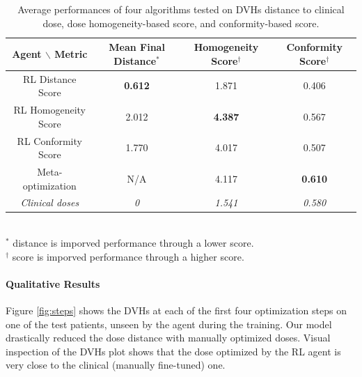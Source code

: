 \begin{table}
	\begin{center}
		\begin{tabular}{| c || c | c | c |} 
			\hline
			Agent $\backslash$ Metric & Mean Final Distance$^*$ & Homogeneity Score$^\dagger$ & Conformity Score$^\dagger$ \\ 
			\hline
			RL Distance Score & \textbf{0.612} & 1.871 & 0.406 \\ 
			RL Homogeneity Score & 2.012 & \textbf{4.387} & 0.567 \\
			RL Conformity Score &  1.770  & 4.017 & 0.507 \\
			Meta-optimization & N/A & 4.117 & \textbf{0.610} \\
			\textit{Clinical doses} & \textit{0} & \textit{1.541} & \textit{0.580} \\	
			\hline
		\end{tabular}
		\\
		$^*$ distance is imporved performance through a lower score.\\
		$^\dagger$ score is imporved performance through a higher score.
	\end{center}
	\caption{
		Average performances of four algorithms tested on DVHs distance to clinical dose, dose homogeneity-based score, and conformity-based score.
	}
	\label{table:results}
\end{table}

\paragraph{Qualitative Results}
Figure \ref{fig:steps} shows the DVHs at each of the first four optimization steps on one of the test patients, unseen by the agent during the training.
Our model drastically reduced the dose distance with manually optimized doses.
Visual inspection of the DVHs plot shows that the dose optimized by the RL agent is very close to the clinical (manually fine-tuned) one.

